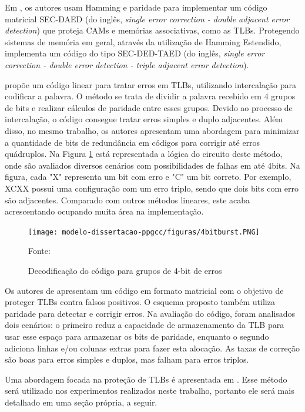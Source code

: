 Em \cite{sanchez2016combined}, os autores usam Hamming e paridade para implementar um código matricial SEC-DAED (do inglês, \textit{single error correction - double adjacent error detection}) que proteja CAMs e memórias associativas, como as TLBs. Protegendo sistemas de memória em geral, \cite{sanchez2012hamming} através da utilização de Hamming Estendido, implementa um código do tipo SEC-DED-TAED (do inglês, \textit{single error correction - double error detection - triple adjacent error detection}).

\cite{li2018efficient} propõe um código linear para tratar erros em TLBs, utilizando intercalação para codificar a palavra. O método se trata de dividir a palavra recebido em 4 grupos de bits e realizar cálculos de paridade entre esses grupos. Devido ao processo de intercalação, o código consegue tratar erros simples e duplo adjacentes. Além disso, no mesmo trabalho, os autores apresentam uma abordagem para minimizar a quantidade de bits de redundância em códigos para corrigir até erros quádruplos. Na Figura \ref{fig:4bit} está representada a lógica do circuito deste método, onde são avaliados diversos cenários com possibilidades de falhas em até 4bits. Na figura, cada "X" representa um bit com erro e "C" um bit correto. Por exemplo, XCXX possui uma configuração com um erro triplo, sendo que dois bits com erro são adjacentes. Comparado com outros métodos lineares, este acaba acrescentando ocupando muita área na implementação. 

\begin{figure}[ht]
    \centering
    \texttt{[image: modelo-dissertacao-ppgcc/figuras/4bitburst.PNG]}
    \caption{Decodificação do código para  grupos de 4-bit de erros}{Fonte: \cite{li2018efficient}}
    \label{fig:4bit}
\end{figure}

Os autores de  \cite{kiani2019improving} apresentam um código em formato matricial com o objetivo de proteger TLBs contra falsos positivos. O esquema proposto também utiliza paridade para detectar e corrigir erros.  Na avaliação do código, foram analisados dois cenários: o primeiro reduz a capacidade de armazenamento da TLB para usar esse espaço para armazenar os bits de paridade, enquanto o segundo adiciona linhas e/ou colunas extras para fazer esta alocação. As taxas de correção são boas para erros simples e duplos, mas falham para erros triplos.

Uma abordagem focada na proteção de TLBs é apresentada em \cite{sanchez2019reducing}. Esse método será utilizado nos experimentos realizados neste trabalho, portanto ele será mais detalhado em uma seção própria, a seguir. 

